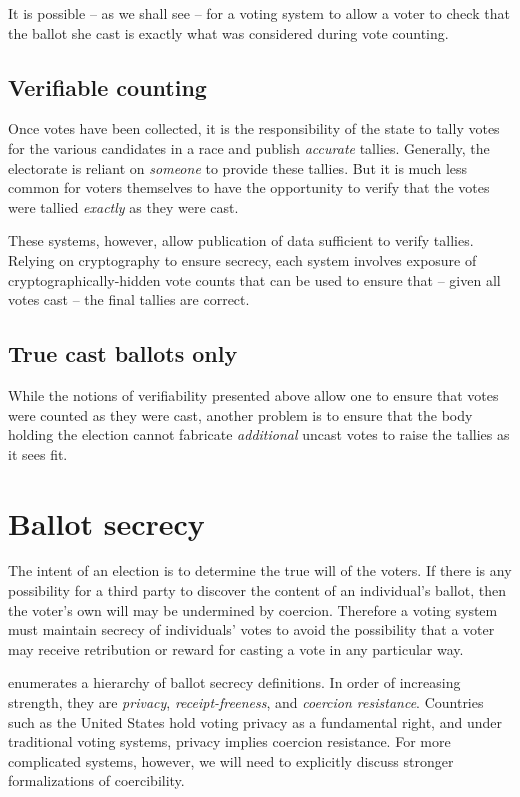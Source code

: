 \documentclass[10pt,twocolumn]{article}
\newcommand{\term}[1]{\textit{#1}}
\begin{document}
It is possible -- as we shall see -- for a voting system to allow a voter to check that the ballot
she cast is exactly what was considered during vote counting.

\subsection{Verifiable counting}

Once votes have been collected, it is the responsibility of the state to tally votes for the various
candidates in a race and publish \emph{accurate} tallies. Generally, the electorate is reliant on
\emph{someone} to provide these tallies. But it is much less common for voters themselves to have
the opportunity to verify that the votes were tallied \emph{exactly} as they were cast.

These systems, however, allow publication of data sufficient to verify tallies. Relying on
cryptography to ensure secrecy, each system involves exposure of cryptographically-hidden vote
counts that can be used to ensure that -- given all votes cast -- the final tallies are correct.

\subsection{True cast ballots only}

While the notions of verifiability presented above allow one to ensure that votes were counted as
they were cast, another problem is to ensure that the body holding the election cannot fabricate
\emph{additional} uncast votes to raise the tallies as it sees fit.

\section{Ballot secrecy}

The intent of an election is to determine the true will of the voters.
If there is any possibility for a third party to discover the content of
an individual's ballot, then the voter's own will may be undermined by coercion.
Therefore a voting system must maintain secrecy of individuals' votes to avoid
the possibility that a voter may receive retribution or reward for casting a vote
in any particular way.

\cite{delaune} enumerates a hierarchy of ballot secrecy definitions.
In order of increasing strength, they are
\term{privacy}, \term{receipt-freeness}, and \term{coercion resistance}.
Countries such as the United States hold voting privacy as a fundamental right,
and under traditional voting systems, privacy implies coercion resistance.
For more complicated systems, however, we will need to explicitly discuss
stronger formalizations of coercibility.
\end{document}

